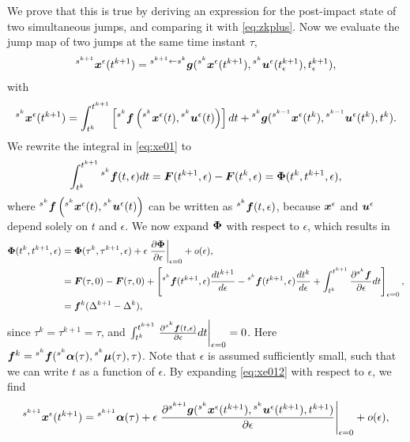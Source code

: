 \documentclass[../DC2017114Bouma.tex]{subfiles}
\begin{document}
We prove that this is true by deriving an expression for the post-impact state of two simultaneous jumps, and comparing it with \eqref{eq:zkplus}. Now we evaluate the jump map of two jumps at the same time instant $\tau$,
\begin{align}
\hspace{0cm}^{s^{k+1}}{\boldsymbol{x}}^\epsilon(t^{k+1}) = \hspace{0cm}^{s^{k+1}\leftarrow s^k}{\boldsymbol{g}}(\hspace{0cm}^{s^k}{\boldsymbol{x}}^{\epsilon}(t^{k+1}),\hspace{0cm}^{s^k}{\boldsymbol{u}}^\epsilon(t_\epsilon^{k+1}),t_\epsilon^{k+1}),\label{eq:xe012}
\end{align}
with
\begin{align}
\hspace{0cm}^{s^k}{\boldsymbol{x}}^{\epsilon}(t^{k+1}) = \int_{t^{k}}^{t^{k+1}}\left[\hspace{0cm}^{s^{k}}{\boldsymbol{f}}\left(\hspace{0cm}^{s^{k}}{\boldsymbol{x}}^\epsilon(t),\hspace{0cm}^{s^{k}}{\boldsymbol{u}}^\epsilon(t)\right)\right]dt + \hspace{0cm}^{s^{k}}{\boldsymbol{g}}(\hspace{0cm}^{s^{k-1}}{\boldsymbol{x}}^\epsilon(t^{k}),\hspace{0cm}^{s^{k-1}}{\boldsymbol{u}}^\epsilon(t^{k}),t^{k}).\label{eq:xe01}
\end{align}
We rewrite the integral in \eqref{eq:xe01} to
\begin{align}
\int_{t^{k}}^{t^{k+1}}\hspace{0cm}^{s^{k}}{\boldsymbol{f}}(t,\epsilon)dt = {\boldsymbol{F}}(t^{k+1},\epsilon) - {\boldsymbol{F}}(t^{k},\epsilon) = \boldsymbol{\Phi}(t^{k},t^{k+1},\epsilon),
\end{align}
where $^{s^{k}}{\boldsymbol{f}}\left(\hspace{0cm}^{s^{k}}{\boldsymbol{x}}^\epsilon(t),\hspace{0cm}^{s^{k}}{\boldsymbol{u}}^\epsilon(t)\right)$ can be written as $\hspace{0cm}^{s^{k}}{\boldsymbol{f}}(t,\epsilon)$, because ${\boldsymbol{x}}^\epsilon$ and ${\boldsymbol{u}}^\epsilon$ depend solely on $t$ and $\epsilon$. We now expand $\boldsymbol{\Phi}$ with respect to $\epsilon$, which results in
\begin{align}
\boldsymbol{\Phi}(t^{k},t^{k+1},\epsilon) &= \boldsymbol{\Phi}(\tau^{k},\tau^{k+1},\epsilon) + \epsilon\left.\frac{\partial\boldsymbol{\Phi}}{\partial\epsilon}\right|_{\epsilon = 0} + o(\epsilon),\\
&= {\boldsymbol{F}}(\tau,0) - {\boldsymbol{F}}(\tau,0) + \left[\hspace{0cm}^{s^{k}}{\boldsymbol{f}}(t^{k+1},\epsilon)\frac{dt^{k+1}}{d\epsilon} - \hspace{0cm}^{s^{k}}{\boldsymbol{f}}(t^{k+1},\epsilon)\frac{dt^{k}}{d\epsilon} + \int_{t^{k}}^{t^{k+1}}\frac{\partial\hspace{0cm}^{s^{k}}{\boldsymbol{f}}}{\partial\epsilon}dt\right]_{\epsilon=0},\\
&= {\boldsymbol{f}}^{k}(\Delta^{k+1}-\Delta^{k}), 
\end{align}
since $\tau^k = \tau^{k+1} = \tau$, and $\int_{t^{k}}^{t^{k+1}}\left.\frac{\partial\hspace{0cm}^{s^{k}}{\boldsymbol{f}}(t,\epsilon)}{\partial\epsilon}dt\right|_{\epsilon = 0} = 0$. Here ${\boldsymbol{f}}^{k} = \hspace{0cm}^{s^{k}}{\boldsymbol{f}}(\hspace{0cm}^{s^{k}}\boldsymbol{\alpha}(\tau),\hspace{0cm}^{s^{k}}\boldsymbol{\mu}(\tau),\tau)$. Note that $\epsilon$ is assumed sufficiently small, such that we can write $t$ as a function of $\epsilon$. By expanding \eqref{eq:xe012} with respect to $\epsilon$, we find
\begin{align}
\hspace{0cm}^{s^{k+1}}{\boldsymbol{x}}^\epsilon(t^{k+1}) = \hspace{0cm}^{s^{k+1}}\boldsymbol{\alpha}(\tau) + \epsilon\left.\frac{\partial\hspace{0cm}^{s^{k+1}}{\boldsymbol{g}}(\hspace{0cm}^{s^{k}}{\boldsymbol{x}}^\epsilon(t^{k+1}),\hspace{0cm}^{s^{k}}{\boldsymbol{u}}^\epsilon(t^{k+1}),t^{k+1})}{\partial\epsilon}\right|_{\epsilon=0} + o(\epsilon),\label{eq:xe012exp}
\end{align}
\end{document}
